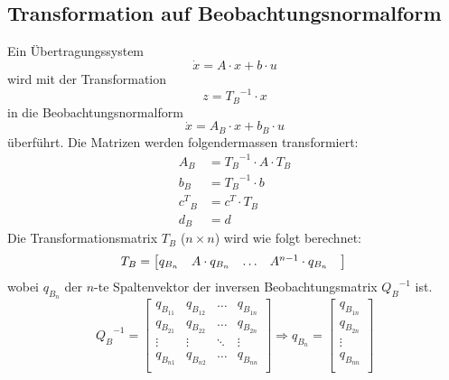 \subsection{Transformation auf Beobachtungsnormalform}
Ein Übertragungssystem 
\[ \dot{x}=A\cdot x +  b \cdot u \]
wird mit der Transformation  
\[ z={T_B}^{-1}\cdot x \]
in die Beobachtungsnormalform
\[ \dot{x}=A_B\cdot x +  b_B \cdot u \]
überführt. Die Matrizen werden folgendermassen transformiert:
\[\begin{aligned}
	A_B &= {T_B}^{-1}\cdot A \cdot {T_B}	\\	
	b_B &= {T_B}^{-1}\cdot b	\\	
	{c^T}_B &= c^T\cdot T_B	\\	
	d_B &= d
\end{aligned}\]
Die Transformationsmatrix $T_B$ ($n\times n$) wird wie folgt berechnet:
\[
	T_B=
	\begin{bmatrix}
		q_{B_n} & A\cdot q_{B_n} &  \ldots & A^{n-1}\cdot q_{B_n} & \\
	\end{bmatrix}	\\
\]
wobei $q_{B_n}$ der $n$-te Spaltenvektor der inversen Beobachtungsmatrix ${Q_B}^{-1}$ ist.
\[
	{Q_B}^{-1} = \begin{bmatrix}
	 q_{B_{11}} & q_{B_{12}} & \ldots & q_{B_{1n}}\\
	 q_{B_{21}} & q_{B_{22}} & \ldots & q_{B_{2n}}\\
	 \vdots		& \vdots	 & \ddots & \vdots\\
	 q_{B_{n1}} & q_{B_{n2}} & \ldots & q_{B_{nn}}\\	 
	\end{bmatrix} \Rightarrow
	q_{B_n}=
	\begin{bmatrix}
		q_{B_{1n}} \\
		q_{B_{2n}} \\
		\vdots \\
		q_{B_{nn}} \\
	\end{bmatrix}	
\]


